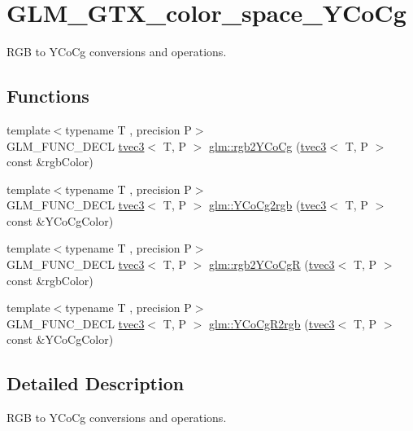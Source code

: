 \hypertarget{group__gtx__color__space__YCoCg}{}\section{G\+L\+M\+\_\+\+G\+T\+X\+\_\+color\+\_\+space\+\_\+\+Y\+Co\+Cg}
\label{group__gtx__color__space__YCoCg}


R\+GB to Y\+Co\+Cg conversions and operations.  


\subsection*{Functions}
\begin{DoxyCompactItemize}
\item 
{\footnotesize template$<$typename T , precision P$>$ }\\G\+L\+M\+\_\+\+F\+U\+N\+C\+\_\+\+D\+E\+CL \hyperlink{structglm_1_1tvec3}{tvec3}$<$ T, P $>$ \hyperlink{group__gtx__color__space__YCoCg_ga19481f6947c5b5482debd41e71b8c941}{glm\+::rgb2\+Y\+Co\+Cg} (\hyperlink{structglm_1_1tvec3}{tvec3}$<$ T, P $>$ const \&rgb\+Color)
\item 
{\footnotesize template$<$typename T , precision P$>$ }\\G\+L\+M\+\_\+\+F\+U\+N\+C\+\_\+\+D\+E\+CL \hyperlink{structglm_1_1tvec3}{tvec3}$<$ T, P $>$ \hyperlink{group__gtx__color__space__YCoCg_ga6d7e988a79b299ca1fa59f537e13800b}{glm\+::\+Y\+Co\+Cg2rgb} (\hyperlink{structglm_1_1tvec3}{tvec3}$<$ T, P $>$ const \&Y\+Co\+Cg\+Color)
\item 
{\footnotesize template$<$typename T , precision P$>$ }\\G\+L\+M\+\_\+\+F\+U\+N\+C\+\_\+\+D\+E\+CL \hyperlink{structglm_1_1tvec3}{tvec3}$<$ T, P $>$ \hyperlink{group__gtx__color__space__YCoCg_ga2e534594cc8ad252d23b14fb363ae9e2}{glm\+::rgb2\+Y\+Co\+CgR} (\hyperlink{structglm_1_1tvec3}{tvec3}$<$ T, P $>$ const \&rgb\+Color)
\item 
{\footnotesize template$<$typename T , precision P$>$ }\\G\+L\+M\+\_\+\+F\+U\+N\+C\+\_\+\+D\+E\+CL \hyperlink{structglm_1_1tvec3}{tvec3}$<$ T, P $>$ \hyperlink{group__gtx__color__space__YCoCg_ga4bac5462c00df0ae89242ecdbbe5dbad}{glm\+::\+Y\+Co\+Cg\+R2rgb} (\hyperlink{structglm_1_1tvec3}{tvec3}$<$ T, P $>$ const \&Y\+Co\+Cg\+Color)
\end{DoxyCompactItemize}


\subsection{Detailed Description}
R\+GB to Y\+Co\+Cg conversions and operations. 

